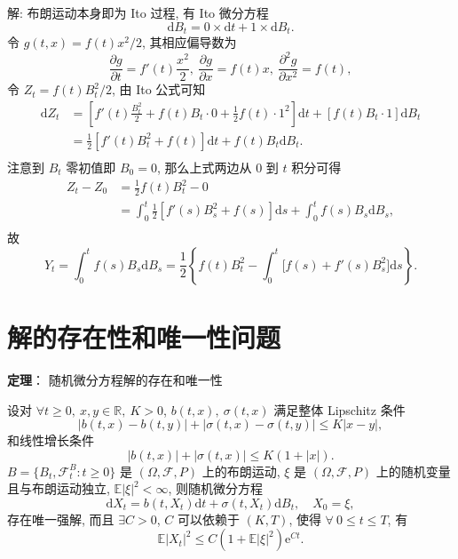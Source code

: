 \documentclass[openany]{ctexbook}
\theoremstyle{kaiti}
\theoremstyle{normal}
\begin{document}
解: 布朗运动本身即为 Ito 过程, 有 Ito 微分方程
\begin{equation}
  \mathrm{d}B_t=0\times\mathrm{d}t+1\times\mathrm{d}B_t.
\end{equation}
令 $g(t,x)=f(t)x^2/2$, 其相应偏导数为
\begin{equation}
  \frac{\partial g}{\partial t}=f'(t)\frac{x^2}{2},~
  \frac{\partial g}{\partial x}=f(t)x,~
  \frac{\partial^2 g}{\partial x^2}=f(t),
\end{equation}
令 $Z_t=f(t)B_t^2/2$, 由 Ito 公式可知
\begin{equation}
  \begin{aligned}
    \mathrm{d}Z_t
    &=\left[f'(t)\frac{B_t^2}{2}+f(t)B_t\cdot0+\frac{1}{2}f(t)\cdot1^2\right]\mathrm{d}t+[f(t)B_t\cdot1]\mathrm{d}B_t\\
    &=\frac{1}{2}[f'(t)B_t^2+f(t)]\mathrm{d}t+f(t)B_t\mathrm{d}B_t.\\
  \end{aligned}
\end{equation}
注意到 $B_t$ 零初值即 $B_0=0$, 那么上式两边从 $0$ 到 $t$ 积分可得
\begin{equation}
  \begin{aligned}
    Z_t-Z_0
    &=\frac{1}{2}f(t)B_t^2-0\\
    &=\int_0^t\frac{1}{2}\left[f'(s)B_s^2+f(s)\right]\mathrm{d}s+\int_0^tf(s)B_s\mathrm{d}B_s,\\
  \end{aligned}
\end{equation}
故
\begin{equation}
  Y_t=\int_0^tf(s)B_s\mathrm{d}B_s=\frac{1}{2}\left\{f(t)B_t^2-\int_0^t\Big[f(s)+f'(s)B_s^2\Big]\mathrm{d}s\right\}.
\end{equation}

\section{解的存在性和唯一性问题}

\textbf{定理}： 随机微分方程解的存在和唯一性

设对 $\forall t\geqslant0,~x,y\in\mathbb{R},~K>0$, $b(t,x),~\sigma(t,x)$ 满足整体 Lipschitz 条件
\begin{equation}
  |b(t,x)-b(t,y)|+|\sigma(t,x)-\sigma(t,y)|\leqslant K|x-y|,
\end{equation}
和线性增长条件
\begin{equation}
  |b(t,x)|+|\sigma(t,x)|\leqslant K(1+|x|).
\end{equation}
$B=\{B_t,\mathcal{F}_t^B:t\geqslant0\}$ 是 $(\Omega,\mathcal{F},P)$ 上的布朗运动, $\xi$ 是 $(\Omega,\mathcal{F},P)$ 上的随机变量且与布朗运动独立, $\mathbb{E}|\xi|^2<\infty$, 则随机微分方程
\begin{equation}
  \mathrm{d}X_t=b(t,X_t)\mathrm{d}t+\sigma(t,X_t)\mathrm{d}B_t,\quad X_0=\xi,
\end{equation}
存在唯一强解, 而且 $\exists C>0$, $C$ 可以依赖于 $(K,T)$, 使得 $\forall~0\leqslant t\leqslant T$, 有
\begin{equation}
  \mathbb{E}|X_t|^2\leqslant C(1+\mathbb{E}|\xi|^2)\mathrm{e}^{Ct}.
\end{equation}
\end{document}
